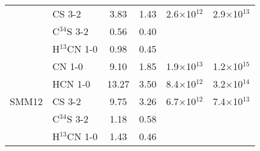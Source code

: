\documentclass{aa}
\begin{document}
\begin{appendix}
\begin{table*}
\begin{tabular}{l l c c c c}
{} & CS 3-2 & 3.83 & 1.43 & 2.6$\times$10$^{12}$ & 2.9$\times$10$^{13}$ \\  
{} & C$^{34}$S 3-2 & 0.56 & 0.40 &  & \\ 
{} & H$^{13}$CN 1-0 & 0.98 & 0.45 &  &\\ 
\hline
\multirow{5}{*}{SMM12} & CN 1-0 & 9.10 & 1.85 & 1.9$\times$10$^{13}$ & 1.2$\times$10$^{15}$\\
{} & HCN 1-0 & 13.27 & 3.50 & 8.4$\times$10$^{12}$ & 3.2$\times$10$^{14}$\\ 
{} & CS 3-2 & 9.75 & 3.26 & 6.7$\times$10$^{12}$ & 7.4$\times$10$^{13}$\\  
{} & C$^{34}$S 3-2 & 1.18 & 0.58 &  &\\ 
{} & H$^{13}$CN 1-0 & 1.43 & 0.46 & & \\ 
\hline
\end{tabular}
\end{table*}

\end{appendix}
\end{document}
